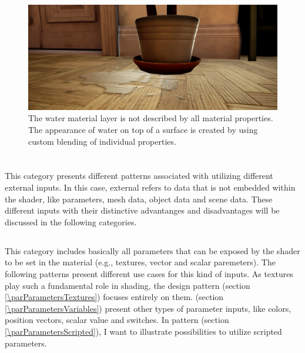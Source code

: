 \begin{figure}
	\centering
	\includegraphics[width=0.7\linewidth]{images/07cha_22_leaFloorWaterBlend.jpg}
	\caption{\NEW
		The water material layer is not described by all material properties. The appearance of water on top of a surface is created by using custom blending of individual properties.   }
	\label{fig:leafloorwaterblend}
\end{figure}




\section{\patCatExternalInputs}\label{\patCatExternalInputs}

This category presents different patterns associated with utilizing different external inputs. In this case, external refers to data that is not embedded within the shader, like parameters, mesh data, object data and scene data. These different inputs with their distinctive advantanges and disadvantages will be discussed in the following categories. 


\subsection{\patCatParameters}\label{\patCatParameters}

This category includes basically all parameters that can be exposed by the shader to be set in the material (e.g., textures, vector and scalar paremeters). The following patterns present different use cases for this kind of inputs. As textures play such a fundamental role in shading, the design pattern \emph{\parParametersTextures} (section \ref{\parParametersTextures}) focuses entirely on them. \emph{\parParametersVariables} (section \ref{\parParametersVariables}) present other types of parameter inputs, like colors, position vectors, scalar value and switches. In pattern \emph{\parParametersScripted} (section \ref{\parParametersScripted}), I want to illustrate possibilities to utilize scripted parameters.

